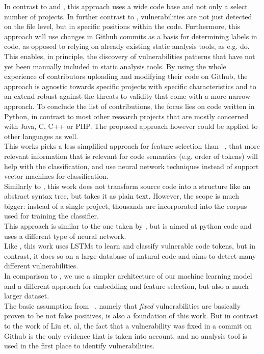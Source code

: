 \documentclass[
	a4paper,
	pagesize,
	pdftex,
	12pt,
	twoside, %
	BCOR=5mm, %
	ngerman,
	fleqn,
	final,
	]{scrartcl}
\begin{document}
In contrast to \cite{Li.2018} and \cite{Dam.2017}, this approach uses a wide code base and not only a select number of projects. In further contrast to \cite{Dam.2017}, vulnerabilities are not just detected on the file level, but in specific positions within the code. 
Furthermore, this approach will use changes in Github commits as a basis for determining labels in code, as opposed to relying on already existing static analysis tools, as e.g.  \cite{Russell.2018} do. This enables, in principle, the discovery of vulnerabilities patterns that have not yet been manually included in static analysis tools. By using the whole experience of contributors uploading and modifying their code on Github, the approach is agnostic towards specific projects with specific characteristics and to an extend robust against the threats to validity that come with a more narrow approach. To conclude the list of contributions, the focus lies on code written in Python, in contrast to most other research projects that are mostly concerned with Java, C, C++ or PHP. The proposed approach however could be applied to other languages as well. \\
This works picks a less simplified approach for feature selection than ~\cite{Pang.2015}, that more relevant information that is relevant for code semantics (e.g. order of tokens) will help with the classification, and use neural network techniques instead of support vector machines for classification. \\
Similarly to \cite{Hovsepyan.2012}, this work does not transform source code into a structure like an abstract syntax tree, but takes it as plain text. However, the scope is much bigger: instead of a single project, thousands are incorporated into the corpus used for training the classifier. \\
This approach is similar to the one taken by \cite{Russell.2018}, but is aimed at python code and uses a different type of neural network. \\
Like \cite{Li.2018}, this work uses LSTMs to learn and classify vulnerable code tokens, but in contrast, it does so on a large database of natural code and aims to detect many different vulnerabilities. \\
In comparison to \cite{Dam.2017}, we use a simpler architecture of our machine learning model and a different approach for embedding and feature selection, but also a much larger dataset. \\
The basic assumption from ~\cite{Liu.2018}, namely that \textit{fixed} vulnerabilities are basically proven to be not false positives, is also a foundation of this work. But in contrast to the work of Liu et. al, the fact that a vulnerability was fixed in a commit on Github is the only evidence that is taken into account, and no analysis tool is used in the first place to identify vulnerabilities.
\end{document}
